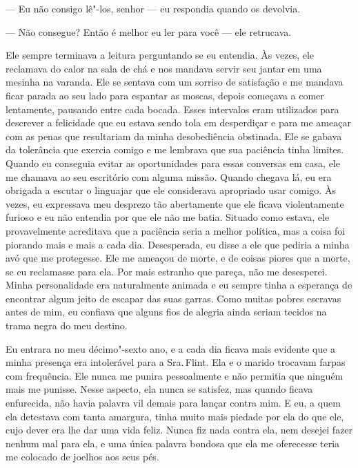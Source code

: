 --- Eu não consigo lê"-los, senhor --- eu respondia quando os devolvia.

--- Não consegue? Então é melhor eu ler para você --- ele retrucava.

Ele sempre terminava a leitura perguntando se eu entendia. Às vezes, ele
reclamava do calor na sala de chá e nos mandava servir seu jantar em uma
mesinha na varanda. Ele se sentava com um sorriso de satisfação e me
mandava ficar parada ao seu lado para espantar as moscas, depois
começava a comer lentamente, pausando entre cada bocada. Esses
intervalos eram utilizados para descrever a felicidade que eu estava
sendo tola em desperdiçar e para me ameaçar com as penas que resultariam
da minha desobediência obstinada. Ele se gabava da tolerância que
exercia comigo e me lembrava que sua paciência tinha limites. Quando eu
conseguia evitar as oportunidades para essas conversas em casa, ele me
chamava ao seu escritório com alguma missão. Quando chegava lá, eu era
obrigada a escutar o linguajar que ele considerava apropriado usar
comigo. Às vezes, eu expressava meu desprezo tão abertamente que ele
ficava violentamente furioso e eu não entendia por que ele não me batia.
Situado como estava, ele provavelmente acreditava que a paciência seria
a melhor política, mas a coisa foi piorando mais e mais a cada dia.
Desesperada, eu disse a ele que pediria a minha avó que me protegesse.
Ele me ameaçou de morte, e de coisas piores que a morte, se eu
reclamasse para ela. Por mais estranho que pareça, não me desesperei.
Minha personalidade era naturalmente animada e eu sempre tinha a
esperança de encontrar algum jeito de escapar das suas garras. Como
muitas pobres escravas antes de mim, eu confiava que alguns fios de
alegria ainda seriam tecidos na trama negra do meu destino.

Eu entrara no meu décimo"-sexto ano, e a
cada dia ficava mais evidente que a minha presença era intolerável para
a Sra.\,Flint. Ela e o marido trocavam farpas com frequência. Ele nunca
me punira pessoalmente e não permitia que ninguém mais me punisse. Nesse
aspecto, ela nunca se satisfez, mas quando ficava enfurecida, não havia
palavra vil demais para lançar contra mim. E eu, a quem ela detestava
com tanta amargura, tinha muito mais piedade por ela do que ele, cujo
dever era lhe dar uma vida feliz. Nunca fiz nada contra ela, nem desejei
fazer nenhum mal para ela, e uma única palavra bondosa que ela me
oferecesse teria me colocado de joelhos aos seus pés.

